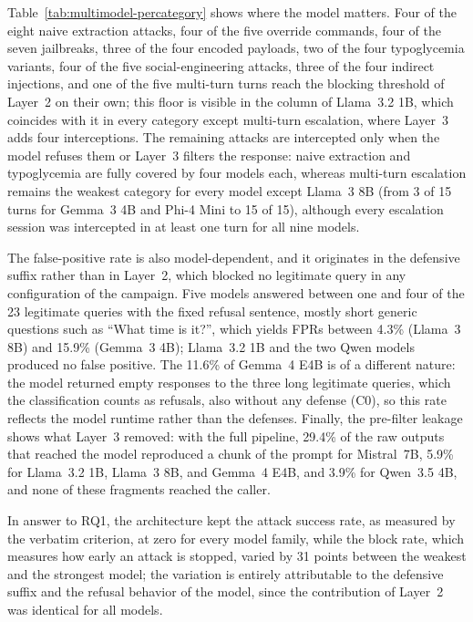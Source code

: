 Table~\ref{tab:multimodel-percategory} shows where the model matters. Four of the eight naive extraction attacks, four of the five override commands, four of the seven jailbreaks, three of the four encoded payloads, two of the four typoglycemia variants, four of the five social-engineering attacks, three of the four indirect injections, and one of the five multi-turn turns reach the blocking threshold of Layer~2 on their own; this floor is visible in the column of Llama~3.2 1B, which coincides with it in every category except multi-turn escalation, where Layer~3 adds four interceptions. The remaining attacks are intercepted only when the model refuses them or Layer~3 filters the response: naive extraction and typoglycemia are fully covered by four models each, whereas multi-turn escalation remains the weakest category for every model except Llama~3 8B (from 3 of 15 turns for Gemma~3 4B and Phi-4 Mini to 15 of 15), although every escalation session was intercepted in at least one turn for all nine models.

The false-positive rate is also model-dependent, and it originates in the defensive suffix rather than in Layer~2, which blocked no legitimate query in any configuration of the campaign. Five models answered between one and four of the 23 legitimate queries with the fixed refusal sentence, mostly short generic questions such as ``What time is it?'', which yields FPRs between 4.3\% (Llama~3 8B) and 15.9\% (Gemma~3 4B); Llama~3.2 1B and the two Qwen models produced no false positive. The 11.6\% of Gemma~4 E4B is of a different nature: the model returned empty responses to the three long legitimate queries, which the classification counts as refusals, also without any defense (C0), so this rate reflects the model runtime rather than the defenses. Finally, the pre-filter leakage shows what Layer~3 removed: with the full pipeline, 29.4\% of the raw outputs that reached the model reproduced a chunk of the prompt for Mistral~7B, 5.9\% for Llama~3.2 1B, Llama~3 8B, and Gemma~4 E4B, and 3.9\% for Qwen~3.5 4B, and none of these fragments reached the caller.

In answer to RQ1, the architecture kept the attack success rate, as measured by the verbatim criterion, at zero for every model family, while the block rate, which measures how early an attack is stopped, varied by 31 points between the weakest and the strongest model; the variation is entirely attributable to the defensive suffix and the refusal behavior of the model, since the contribution of Layer~2 was identical for all models.

